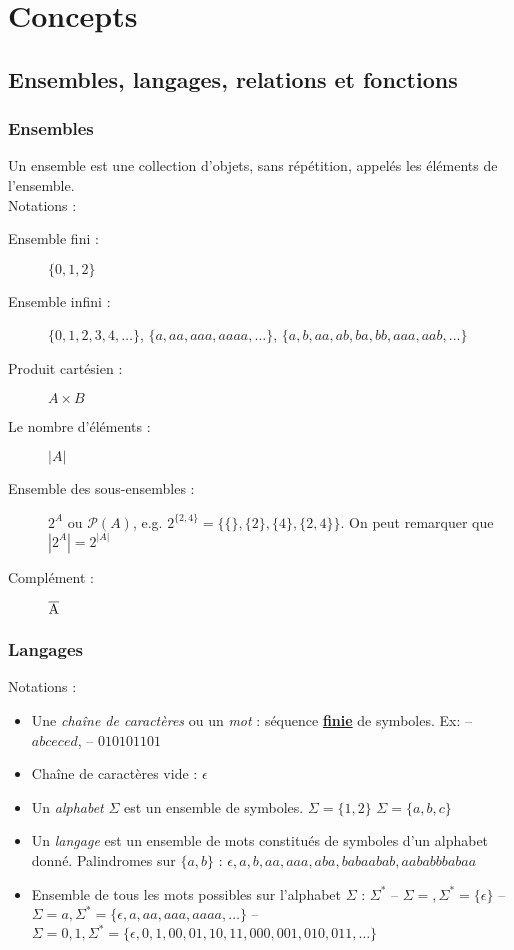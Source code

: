 
\chapter{Concepts}
\label{ch:concepts}

\section{Ensembles, langages, relations et fonctions}
\label{sec:ensembles_langages_relations_et_fonctions}

\subsection{Ensembles}
\label{subsec:ensembles}
Un ensemble est une collection d'objets, sans répétition, appelés les éléments
de l'ensemble.\\

Notations :
\begin{description}
	\item [Ensemble fini :] $\{ 0, 1, 2\}$
	\item [Ensemble infini :] $\{ 0, 1, 2, 3, 4, \ldots\}$, $\{a, aa, aaa, aaaa, \ldots\}$, $\{a, b, aa, ab, ba, bb, aaa, aab, \ldots\}$
	\item [Produit cartésien :] $A \times B$
    \item [Le nombre d'éléments :] $|A|$
    \item [Ensemble des sous-ensembles :] $2^A$ ou $\mathcal{P}(A)$, e.g. $2^{\{2,4\}} = \{\{\}, \{2\}, \{4\}, \{2,4\}\}$.
      On peut remarquer que $|2^A| = 2^{|A|}$
	\item [Complément :] $\overline{\mathrm{A}}$
\end{description}


\subsection{Langages}
\label{subsec:Langages}
Notations :
\begin{itemize}
    \item Une \emph{chaîne de caractères} ou un \emph{mot} : séquence \textbf{\underline{finie}} de symboles. Ex:
		\subitem -- $abceced$, 
		\subitem -- $010101101$
	\item Chaîne de caractères vide : $\epsilon$
    \item Un \emph{alphabet} $\Sigma$ est un ensemble de symboles. $\Sigma = \{1, 2\}$ $\Sigma = \{a, b, c\}$
    \item Un \emph{langage} est un ensemble de mots constitués de symboles d'un alphabet donné.
    	\subitem Palindromes sur $\{a, b\}$ : $\epsilon, a, b, aa, aaa, aba, babaabab, aababbbabaa$
	\item Ensemble de tous les mots possibles sur l'alphabet $\Sigma$ : $\Sigma ^*$
		\subitem -- $\Sigma = {}, \Sigma^* = \{\epsilon\}$
		\subitem -- $\Sigma = {a}, \Sigma^* = \{\epsilon, a,aa,aaa,aaaa, \ldots\}$
		\subitem -- $\Sigma = {0,1}, \Sigma^* = \{\epsilon, 0,1,00,01,10,11,000,001,010,011, \ldots\}$
\end{itemize}

